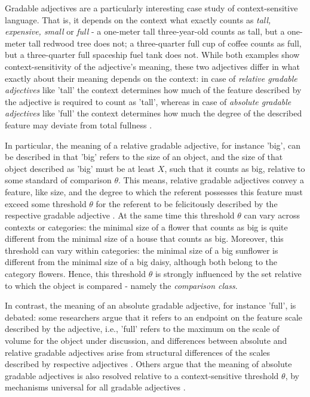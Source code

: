 Gradable adjectives are a particularly interesting case study of context-sensitive language. That is, it depends on the context what exactly counts as \textit{tall, expensive, small} or \textit{full} - a one-meter tall three-year-old counts as tall, but a one-meter tall redwood tree does not; a three-quarter full cup of coffee counts as full, but a three-quarter full spaceship fuel tank does not. While both examples show context-sensitivity of the adjective's meaning, these two adjectives differ in what exactly about their meaning depends on the context: in case of \textit{relative gradable adjectives} like 'tall' the context determines how much of the feature described by the adjective is required to count as 'tall', whereas in case of \textit{absolute gradable adjectives} like 'full' the context determines how much the degree of the described feature may deviate from total fullness \parencite{Aparicio2016, Kennedy2007, hofherr2010adjectives}.  

In particular, the meaning of a relative gradable adjective, for instance 'big', can be described in that 'big' refers to the size of an object, and the size of that object  described as 'big' must be at least $X$, such that it counts as big, relative to some standard of comparison $\theta$. This means, relative gradable adjectives convey a feature, like size, and the degree to which the referent possesses this feature must exceed some threshold $\theta$ for the referent to be felicitously described by the respective gradable adjective \parencite[e.g.,][]{Kennedy2007}. At the same time this threshold $\theta$ can vary across contexts or categories: the minimal size of a flower that counts as big is quite different from the minimal size of a house that counts as big. Moreover, this threshold can vary within categories: the minimal size of a big sunflower is different from the minimal size of a big daisy, although both belong to the category flowers. Hence, this threshold $\theta$ is strongly influenced by the set relative to which the object is compared - namely the \textit{comparison class}.

In contrast, the meaning of an absolute gradable adjective, for instance 'full', is debated: some researchers argue that it refers to an endpoint on the feature scale described by the adjective, i.e., 'full' refers to the maximum on the scale of volume for the object under discussion, and differences between absolute and relative gradable adjectives arise from structural differences of the scales described by respective adjectives \parencite{Kennedy2007, Aparicio2016, Qing2014}. Others argue that the meaning of absolute gradable adjectives is also resolved relative to a context-sensitive threshold $\theta$, by mechanisms universal for all gradable adjectives \parencite{lassiter2017adjectival}.

